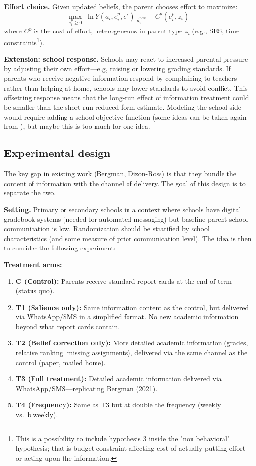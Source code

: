 \documentclass[11pt]{article}
\begin{document}
\medskip
\noindent \textbf{Effort choice.} Given updated beliefs, the parent chooses effort to maximize:
\[
\max_{e_i^p \geq 0} \; \ln Y(a_i, e_i^p, e^s) \Big|_{\hat{a}_{i}^{\text{post}}} - C^p(e_i^p, z_i)
\]
where $C^p$ is the cost of effort, heterogeneous in parent type $z_i$ (e.g., SES, time constraints\footnote{This is a possibility to include hypothesis 3 inside the "non behavioral" hypothesis; that is budget constraint affecting cost of actually putting effort or acting upon the information.}).

\medskip
\noindent \textbf{Extension: school response.}  Schools may react to increased parental pressure by adjusting their own effort---e.g, raising or lowering grading standards. If parents who receive negative information respond by complaining to teachers rather than helping at home, schools may lower standards to avoid conflict. This offsetting response means that the long-run effect of information treatment could be smaller than the short-run reduced-form estimate. Modeling the school side would require adding a school objective function (some ideas can be taken again from \citet{fu2018ability}), but maybe this is too much for one idea.

\subsection{Experimental design}

The key gap in existing work (Bergman, Dizon-Ross) is that they bundle the content of information with the channel of delivery. The goal of this design is to separate the two.

\medskip
\noindent \textbf{Setting.} Primary or secondary schools in a context where schools have digital gradebook systems (needed for automated messaging) but baseline parent-school communication is low. Randomization should be stratified by school characteristics (and some measure of prior communication level). The idea is then to consider the following experiment:

\medskip
\noindent \textbf{Treatment arms:}
\begin{enumerate}
    \item \textbf{C (Control):} Parents receive standard report cards at the end of term (status quo).
    \item \textbf{T1 (Salience only):} Same information content as the control, but delivered via WhatsApp/SMS in a simplified format. No new academic information beyond what report cards contain.
    \item \textbf{T2 (Belief correction only):} More detailed academic information (grades, relative ranking, missing assignments), delivered via the same channel as the control (paper, mailed home).
    \item \textbf{T3 (Full treatment):} Detailed academic information delivered via WhatsApp/SMS---replicating Bergman (2021).
    \item \textbf{T4 (Frequency):} Same as T3 but at double the frequency (weekly vs.\ biweekly).
\end{enumerate}
\end{document}
